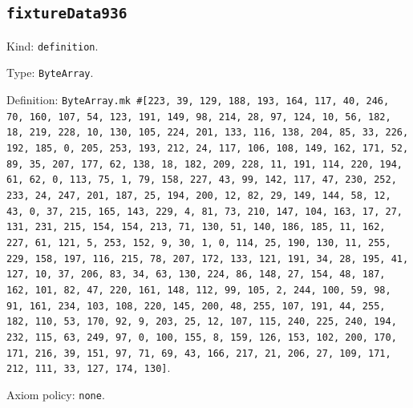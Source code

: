 \documentclass[11pt]{article}
\begin{document}
\subsection*{\texttt{fixtureData936}}
\noindent Kind: \texttt{definition}.\par
\noindent Type: \texttt{ByteArray}.\par
\noindent Definition: \texttt{ByteArray.mk \#[223, 39, 129, 188, 193, 164, 117, 40, 246, 70, 160, 107, 54, 123, 191, 149, 98, 214, 28, 97, 124, 10, 56, 182, 18, 219, 228, 10, 130, 105, 224, 201, 133, 116, 138, 204, 85, 33, 226, 192, 185, 0, 205, 253, 193, 212, 24, 117, 106, 108, 149, 162, 171, 52, 89, 35, 207, 177, 62, 138, 18, 182, 209, 228, 11, 191, 114, 220, 194, 61, 62, 0, 113, 75, 1, 79, 158, 227, 43, 99, 142, 117, 47, 230, 252, 233, 24, 247, 201, 187, 25, 194, 200, 12, 82, 29, 149, 144, 58, 12, 43, 0, 37, 215, 165, 143, 229, 4, 81, 73, 210, 147, 104, 163, 17, 27, 131, 231, 215, 154, 154, 213, 71, 130, 51, 140, 186, 185, 11, 162, 227, 61, 121, 5, 253, 152, 9, 30, 1, 0, 114, 25, 190, 130, 11, 255, 229, 158, 197, 116, 215, 78, 207, 172, 133, 121, 191, 34, 28, 195, 41, 127, 10, 37, 206, 83, 34, 63, 130, 224, 86, 148, 27, 154, 48, 187, 162, 101, 82, 47, 220, 161, 148, 112, 99, 105, 2, 244, 100, 59, 98, 91, 161, 234, 103, 108, 220, 145, 200, 48, 255, 107, 191, 44, 255, 182, 110, 53, 170, 92, 9, 203, 25, 12, 107, 115, 240, 225, 240, 194, 232, 115, 63, 249, 97, 0, 100, 155, 8, 159, 126, 153, 102, 200, 170, 171, 216, 39, 151, 97, 71, 69, 43, 166, 217, 21, 206, 27, 109, 171, 212, 111, 33, 127, 174, 130]}.\par
\noindent Axiom policy: \texttt{none}.\par
\end{document}
